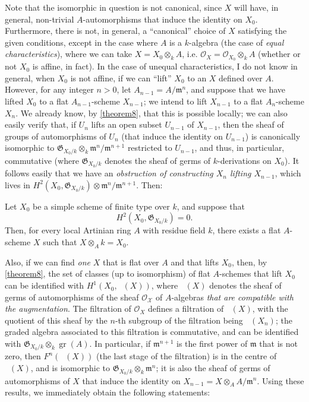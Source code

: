 \documentclass{article}
\theoremstyle{plain}
\newenvironment{corollary}[1]
  {\renewcommand\theinnercustomcorollary{#1}\innercustomcorollary}
  {\endinnercustomcorollary}
\theoremstyle{definition}
\newcommand{\sh}{\mathscr}
\newcommand{\fk}{\mathfrak}
\DeclareMathOperator{\Aut}{Aut}
\DeclareMathOperator{\shAut}{\underline{\Aut}}
\DeclareMathOperator{\gr}{gr}
\newcommand{\oldpage}[1]{\marginpar{\footnotesize$\Big\vert$ \textit{p.~#1}}}
\begin{document}
Note that the isomorphic in question is not canonical, since $X$ will have, in general, non-trivial $A$-automorphisms that induce the identity on $X_0$.
Furthermore, there is not, in general, a ``canonical'' choice of $X$ satisfying the given conditions, except in the case where $A$ is a $k$-algebra (the case of \emph{equal characteristics}), where we can take $X=X_0\otimes_k A$, i.e. $\sh{O}_X=\sh{O}_{X_0}\otimes_k A$ (whether or not $X_0$ is affine, in fact).
In the case of unequal characteristics, I do not know in general, when $X_0$ is not affine, if we can ``lift'' $X_0$ to an $X$ defined over $A$.
However, for any integer $n>0$, let $A_{n-1}=A/\fk{m}^n$, and suppose that we have lifted $X_0$ to a flat $A_{n-1}$-scheme $X_{n-1}$;
we intend to lift $X_{n-1}$ to a flat $A_n$-scheme $X_n$.
We already know, by \cref{theorem8}, that this is possible locally;
we can also easily verify that, if $U_n$ lifts an open subset $U_{n-1}$ of $X_{n-1}$, then the sheaf of groups of automorphisms of $U_n$ (that induce the identity on $U_{n-1}$) is canonically isomorphic to $\fk{G}_{X_0/k}\otimes_k\fk{m}^n/\fk{m}^{n+1}$ restricted to $U_{n-1}$, and thus, in particular, commutative (where $\fk{G}_{X_0/k}$ denotes the sheaf of germs of $k$-derivations on $X_0$).
It follows easily that we have an \emph{obstruction of constructing $X_n$ lifting $X_{n-1}$}, which lives in $H^2(X_0,\fk{G}_{X_0/k})\otimes\fk{m}^n/\fk{m}^{n+1}$.
Then:

\begin{corollary}{1}
\label{theorem8corollary1}
  Let $X_0$ be a simple scheme of finite type over $k$, and suppose that
\oldpage{182-13}
  \[H^2(X_0,\fk{G}_{X_0/k})=0.\]
  Then, for every local Artinian ring $A$ with residue field $k$, there exists a flat $A$-scheme $X$ such that $X\otimes_A k=X_0$.
\end{corollary}

Also, if we can find \emph{one} $X$ that is flat over $A$ and that lifts $X_0$, then, by \cref{theorem8}, the set of classes (up to isomorphism) of flat $A$-schemes that lift $X_0$ can be identified with $H^1(X_0,\shAut(X))$, where $\shAut(X)$ denotes the sheaf of germs of automorphisms of the sheaf $\sh{O_X}$ of $A$-algebras \emph{that are compatible with the augmentation}.
The filtration of $\sh{O}_X$ defines a filtration of $\shAut(X)$, with the quotient of this sheaf by the $n$-th subgroup of the filtration being $\shAut(X_n)$;
the graded algebra associated to this filtration is commutative, and can be identified with $\fk{G}_{X_0/k}\otimes_k\gr(A)$.
In particular, if $\fk{m}^{n+1}$ is the first power of $\fk{m}$ that is not zero, then $F^n(\shAut(X))$ (the last stage of the filtration) is in the centre of $\shAut(X)$, and is isomorphic to $\fk{G}_{X_0/k}\otimes_k\fk{m}^n$;
it is also the sheaf of germs of automorphisms of $X$ that induce the identity on $X_{n-1}=X\otimes_A A/\fk{m}^n$.
Using these results, we immediately obtain the following statements:
\end{document}
